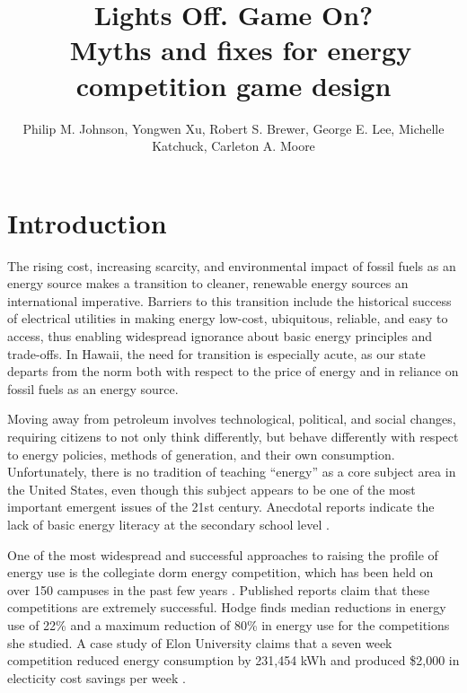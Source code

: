 \documentclass[jou]{apa} %
\title{Lights Off.  Game On? \\ \ 
       Myths and fixes for energy competition game design}
\author{Philip M. Johnson, Yongwen Xu, Robert S. Brewer, George E. Lee, Michelle Katchuck,
  Carleton A. Moore}
\affiliation{Collaborative Software Development Laboratory \\ Information and Computer
  Sciences \\ University of Hawaii \\ Honolulu, HI USA \\ johnson@hawaii.edu}
\begin{document}
\maketitle 

\section{Introduction}  

The rising cost, increasing scarcity, and environmental impact of fossil fuels as an
energy source makes a transition to cleaner, renewable energy sources an international
imperative. Barriers to this transition include the historical success of electrical
utilities in making energy low-cost, ubiquitous, reliable, and easy to access, thus
enabling widespread ignorance about basic energy principles and trade-offs.  In Hawaii,
the need for transition is especially acute, as our state departs from the norm both with
respect to the price of energy and in reliance on fossil fuels as an energy source.

Moving away from petroleum involves technological, political, and social changes,
requiring citizens to not only think differently, but behave differently with respect to
energy policies, methods of generation, and their own consumption. Unfortunately, there is
no tradition of teaching ``energy'' as a core subject area in the United States, even
though this subject appears to be one of the most important emergent issues of the 21st
century. Anecdotal reports indicate the lack of basic energy literacy at the secondary
school level \cite{Ammons2010}.



One of the most widespread and successful approaches to raising the profile of energy use
is the collegiate dorm energy competition, which has been held on over 150 campuses in the
past few years \cite{Hodge2010}.  Published reports claim that these competitions are
extremely successful.  Hodge finds median reductions in energy use of 22\% and a maximum
reduction of 80\% in energy use for the competitions she studied. A case study of Elon
University claims that a seven week competition reduced energy consumption by 231,454 kWh
and produced \$2,000 in electicity cost savings per week \cite{Durr2010}.
\end{document}
